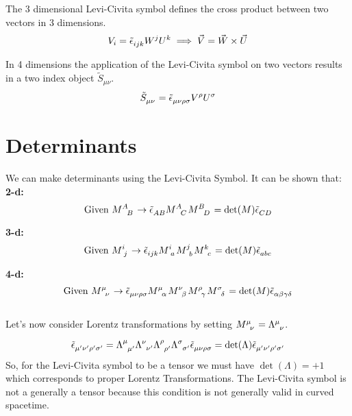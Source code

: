 \documentclass[11pt]{article}
\begin{document}
\noindent The 3 dimensional Levi-Civita symbol defines the cross product between two vectors in 3 dimensions.
\begin{equation}
  V_i=\tensor{\tilde{\epsilon}}{_i_j_k}W^j U^k\implies \vec{V}=\vec{W}\times\vec{U}
\end{equation}

\noindent In 4 dimensions the application of the Levi-Civita symbol on two vectors results in a two index object $\tilde{S}_{\mu\nu}$.
\begin{equation}
  \tensor{\tilde{S}}{_\mu_\nu}=\tensor{\tilde{\epsilon}}{_\mu_\nu_\rho_\sigma}\tensor{V}{^\rho}\tensor{U}{^\sigma}
\end{equation}

\section{Determinants}

We can make determinants using the Levi-Civita Symbol. It can be shown that:\\

\noindent \textbf{2-d:}
\begin{equation}
  \text{Given } \tensor{M}{^A_B}\rightarrow \tensor{\tilde{\epsilon}}{_A_B}\tensor{M}{^A_C}\tensor{M}{^B_D}=\det(M)\tensor{\tilde{\epsilon}}{_C_D}
\end{equation}

\noindent \textbf{3-d:}
\begin{equation}
  \text{Given } \tensor{M}{^i_j}\rightarrow \tensor{\tilde{\epsilon}}{_i_j_k}\tensor{M}{^i_a}\tensor{M}{^j_b}\tensor{M}{^k_c}=\det(M)\tensor{\tilde{\epsilon}}{_a_b_c}
\end{equation}

\noindent \textbf{4-d:}
\begin{equation}
  \text{Given } \tensor{M}{^\mu_\nu}\rightarrow \tensor{\tilde{\epsilon}}{_\mu_\nu_\rho_\sigma}\tensor{M}{^\mu_\alpha}\tensor{M}{^\nu_\beta}\tensor{M}{^\rho_\gamma}\tensor{M}{^\sigma_\delta}=\det(M)\tensor{\tilde{\epsilon}}{_\alpha_\beta_\gamma_\delta}
\end{equation}\\
\noindent Let's now consider Lorentz transformations by setting $\tensor{M}{^\mu_\nu}= \tensor{\Lambda}{^\mu_\nu}$.

\begin{equation}
  \tensor{\tilde{\epsilon}}{_{\mu'}_{\nu'}_{\rho'}_{\sigma'}}=\tensor{\Lambda}{^\mu_{\mu'}}\tensor{\Lambda}{^\nu_{\nu'}}\tensor{\Lambda}{^\rho_{\rho'}}\tensor{\Lambda}{^\sigma_{\sigma'}}\tensor{\tilde{\epsilon}}{_{\mu}_{\nu}_{\rho}_{\sigma}}=\det(\Lambda)\tensor{\tilde{\epsilon}}{_{\mu'}_{\nu'}_{\rho'}_{\sigma'}}
\end{equation}
\noindent So, for the Levi-Civita symbol to be a tensor we must have $\det(\Lambda)=+1$ which corresponds to proper Lorentz Transformations. The Levi-Civita symbol is not a generally a tensor because this condition is not generally valid in curved spacetime.
\end{document}
